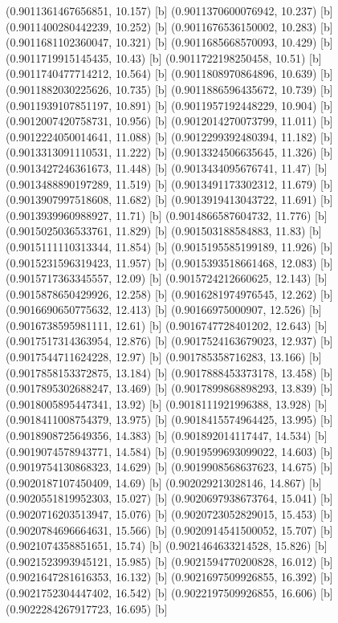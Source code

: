 {{{(0.9011361467656851, 10.157) [b] 
(0.9011370600076942, 10.237) [b] 
(0.9011400280442239, 10.252) [b] 
(0.9011676536150002, 10.283) [b] 
(0.9011681102360047, 10.321) [b] 
(0.9011685668570093, 10.429) [b] 
(0.9011719915145435, 10.43) [b] 
(0.9011722198250458, 10.51) [b] 
(0.9011740477714212, 10.564) [b] 
(0.9011808970864896, 10.639) [b] 
(0.9011882030225626, 10.735) [b] 
(0.9011886596435672, 10.739) [b] 
(0.9011939107851197, 10.891) [b] 
(0.9011957192448229, 10.904) [b] 
(0.9012007420758731, 10.956) [b] 
(0.9012014270073799, 11.011) [b] 
(0.9012224050014641, 11.088) [b] 
(0.9012299392480394, 11.182) [b] 
(0.9013313091110531, 11.222) [b] 
(0.9013324506635645, 11.326) [b] 
(0.9013427246361673, 11.448) [b] 
(0.9013434095676741, 11.47) [b] 
(0.9013488890197289, 11.519) [b] 
(0.9013491173302312, 11.679) [b] 
(0.9013907997518608, 11.682) [b] 
(0.9013919413043722, 11.691) [b] 
(0.9013939960988927, 11.71) [b] 
(0.9014866587604732, 11.776) [b] 
(0.9015025036533761, 11.829) [b] 
(0.901503188584883, 11.83) [b] 
(0.9015111110313344, 11.854) [b] 
(0.9015195585199189, 11.926) [b] 
(0.9015231596319423, 11.957) [b] 
(0.9015393518661468, 12.083) [b] 
(0.9015717363345557, 12.09) [b] 
(0.9015724212660625, 12.143) [b] 
(0.9015878650429926, 12.258) [b] 
(0.9016281974976545, 12.262) [b] 
(0.9016690650775632, 12.413) [b] 
(0.90166975000907, 12.526) [b] 
(0.9016738595981111, 12.61) [b] 
(0.9016747728401202, 12.643) [b] 
(0.9017517314363954, 12.876) [b] 
(0.9017524163679023, 12.937) [b] 
(0.9017544711624228, 12.97) [b] 
(0.901785358716283, 13.166) [b] 
(0.9017858153372875, 13.184) [b] 
(0.9017888453373178, 13.458) [b] 
(0.9017895302688247, 13.469) [b] 
(0.9017899868898293, 13.839) [b] 
(0.9018005895447341, 13.92) [b] 
(0.9018111921996388, 13.928) [b] 
(0.9018411008754379, 13.975) [b] 
(0.9018415574964425, 13.995) [b] 
(0.9018908725649356, 14.383) [b] 
(0.901892014117447, 14.534) [b] 
(0.9019074578943771, 14.584) [b] 
(0.9019599693099022, 14.603) [b] 
(0.9019754130868323, 14.629) [b] 
(0.9019908568637623, 14.675) [b] 
(0.9020187107450409, 14.69) [b] 
(0.902029213028146, 14.867) [b] 
(0.9020551819952303, 15.027) [b] 
(0.9020697938673764, 15.041) [b] 
(0.9020716203513947, 15.076) [b] 
(0.9020723052829015, 15.453) [b] 
(0.9020784696664631, 15.566) [b] 
(0.9020914541500052, 15.707) [b] 
(0.9021074358851651, 15.74) [b] 
(0.9021464633214528, 15.826) [b] 
(0.9021523993945121, 15.985) [b] 
(0.9021594770200828, 16.012) [b] 
(0.9021647281616353, 16.132) [b] 
(0.9021697509926855, 16.392) [b] 
(0.9021752304447402, 16.542) [b] 
(0.9022197509926855, 16.606) [b] 
(0.9022284267917723, 16.695) [b] 
}}}
